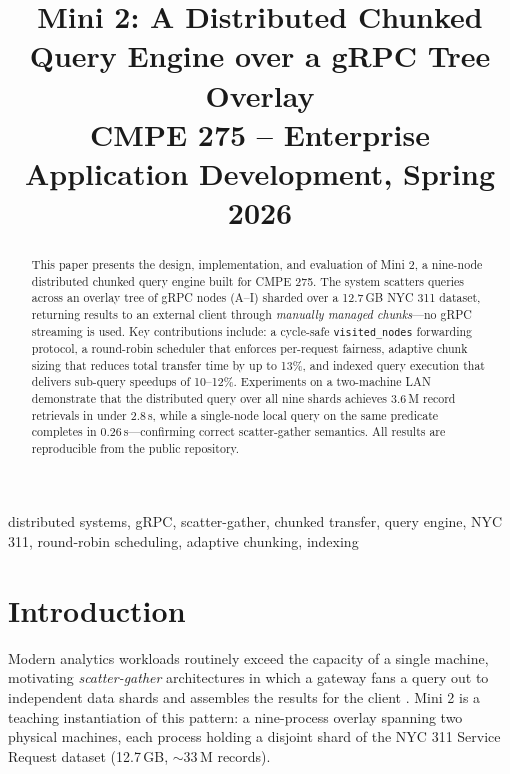 \documentclass[conference]{IEEEtran}
\begin{document}
\title{Mini 2: A Distributed Chunked Query Engine over a gRPC Tree Overlay\\
{\footnotesize CMPE 275 -- Enterprise Application Development, Spring 2026}}

\author{
}

\maketitle

\begin{abstract}
This paper presents the design, implementation, and evaluation of Mini 2, a nine-node
distributed chunked query engine built for CMPE 275. The system scatters queries
across an overlay tree of gRPC nodes (A--I) sharded over a 12.7\,GB NYC 311 dataset,
returning results to an external client through \emph{manually managed chunks}---no
gRPC streaming is used. Key contributions include: a cycle-safe \texttt{visited\_nodes}
forwarding protocol, a round-robin scheduler that enforces per-request fairness,
adaptive chunk sizing that reduces total transfer time by up to 13\%, and indexed
query execution that delivers sub-query speedups of 10--12\%. Experiments on a
two-machine LAN demonstrate that the distributed query over all nine shards
achieves 3.6\,M record retrievals in under 2.8\,s, while a single-node local query
on the same predicate completes in 0.26\,s---confirming correct scatter-gather
semantics. All results are reproducible from the public repository.
\end{abstract}

\begin{IEEEkeywords}
distributed systems, gRPC, scatter-gather, chunked transfer, query engine, NYC 311,
round-robin scheduling, adaptive chunking, indexing
\end{IEEEkeywords}

\section{Introduction}
\label{sec:intro}

Modern analytics workloads routinely exceed the capacity of a single machine,
motivating \emph{scatter-gather} architectures in which a gateway fans a query
out to independent data shards and assembles the results for the client
\cite{dean2008mapreduce}. Mini 2 is a teaching instantiation of this pattern:
a nine-process overlay spanning two physical machines, each process holding a
disjoint shard of the NYC 311 Service Request dataset (12.7\,GB, $\sim$33\,M
records).
\end{document}
